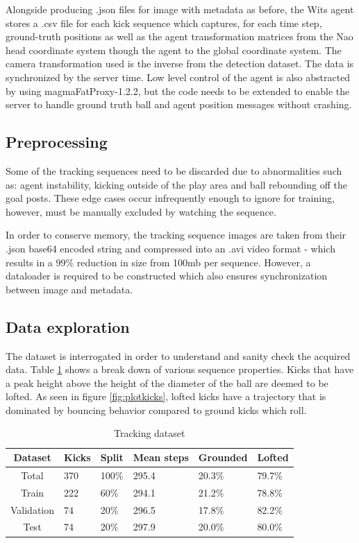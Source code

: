 \documentclass[a4paper,twoside,12pt]{report}
\begin{document}
Alongside producing .json files for image with metadata as before, the Wits agent stores a .csv file for each kick sequence which captures, for each time step, ground-truth positions as well as the agent transformation matrices from the Nao head coordinate system though the agent to the global coordinate system. The camera transformation used is the inverse from the detection dataset. The data is synchronized by the server time. Low level control of the agent is also abstracted by using magmaFatProxy-1.2.2, but the code needs to be extended to enable the server to handle ground truth ball and agent position messages without crashing. 

\subsection{Preprocessing}

Some of the tracking sequences need to be discarded due to abnormalities such as: agent instability, kicking outside of the play area and ball rebounding off the goal posts. These edge cases occur infrequently enough to ignore for training, however, must be manually excluded by watching the sequence. 

In order to conserve memory, the tracking sequence images are taken from their .json base64 encoded string and compressed into an .avi video format - which results in a 99\% reduction in size from 100mb per sequence. However, a dataloader is required to be constructed which also ensures synchronization between image and metadata.

\subsection{Data exploration}

The dataset is interrogated in order to understand and sanity check the acquired data. Table \ref{tab:tracking} shows a break down of various sequence properties. Kicks that have a peak height above the height of the diameter of the ball are deemed to be lofted. As seen in figure \ref{fig:plotkicks}, lofted kicks have a trajectory that is dominated by bouncing behavior compared to ground kicks which roll.

\begin{table}[h!]
\fontsize{9.5pt}{12pt}\selectfont
\centering
\begin{tabular}{c|ll|l|ll}
{\bf Dataset}	&{\bf Kicks}	&{\bf Split}	&{\bf Mean steps}	&{\bf Grounded}	&{\bf Lofted}	\\\hline
Total			&370			&100\%			&295.4			&20.3\%			&79.7\%			\\\hline   
Train			&222			&60\%			&294.1			&21.2\%			&78.8\%			\\\hline  
Validation		&74				&20\%			&296.5			&17.8\%			&82.2\%			\\\hline  
Test			&74				&20\%			&297.9			&20.0\%			&80.0\%			\\\hline                        
\end{tabular}
\caption{Tracking dataset}
\label{tab:tracking}
\end{table}
\end{document}

